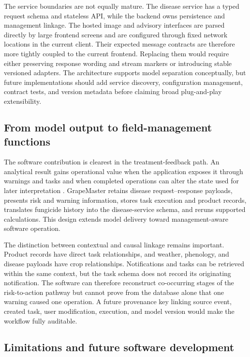 \documentclass[12pt]{article}
\begin{document}
The service boundaries are not equally mature. The disease service has a typed request schema and stateless API, while the backend owns persistence and management linkage. The hosted image and advisory interfaces are parsed directly by large frontend screens and are configured through fixed network locations in the current client. Their expected message contracts are therefore more tightly coupled to the current frontend. Replacing them would require either preserving response wording and stream markers or introducing stable versioned adapters. The architecture supports model separation conceptually, but future implementations should add service discovery, configuration management, contract tests, and version metadata before claiming broad plug-and-play extensibility.

\subsection{From model output to field-management functions}\label{from-analytical-outputs-to-executable-disease-management-records}

The software contribution is clearest in the treatment-feedback path. An analytical result gains operational value when the application exposes it through warnings and tasks and when completed operations can alter the state used for later interpretation \citep{rossiAddressingImplementationProblem2014,rossiSharingDecisionmakingTools2023}. GrapeMaster retains disease request--response payloads, presents risk and warning information, stores task execution and product records, translates fungicide history into the disease-service schema, and reruns supported calculations. This design extends model delivery toward management-aware software operation.

The distinction between contextual and causal linkage remains important. Product records have direct task relationships, and weather, phenology, and disease payloads have crop relationships. Notifications and tasks can be retrieved within the same context, but the task schema does not record its originating notification. The software can therefore reconstruct co-occurring stages of the risk-to-action pathway but cannot prove from the database alone that one warning caused one operation. A future provenance key linking source event, created task, user modification, execution, and model version would make the workflow fully auditable.

\subsection{Limitations and future software development}\label{limitations-and-future-directions}
\end{document}
